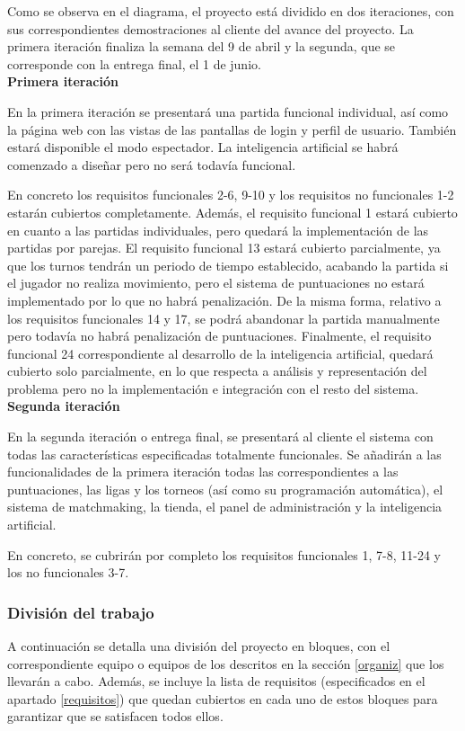 Como se observa en el diagrama, el proyecto está dividido en dos iteraciones, con sus correspondientes demostraciones al cliente del avance del proyecto. La primera iteración finaliza la semana del 9 de abril y la segunda, que se corresponde con la entrega final, el 1 de junio.\\

\textbf{Primera iteración}

En la primera iteración se presentará una partida funcional individual, así como la página web con las vistas de las pantallas de login y perfil de usuario. También estará disponible el modo espectador. La inteligencia artificial se habrá comenzado a diseñar pero no será todavía funcional.

En concreto los requisitos funcionales 2-6, 9-10 y los requisitos no funcionales 1-2 estarán cubiertos completamente. Además, el requisito funcional 1 estará cubierto en cuanto a las partidas individuales, pero quedará la implementación de las partidas por parejas. El requisito funcional 13 estará cubierto parcialmente, ya que los turnos tendrán un periodo de tiempo establecido, acabando la partida si el jugador no realiza movimiento, pero el sistema de puntuaciones no estará implementado por lo que no habrá penalización. De la misma forma, relativo a los requisitos funcionales 14 y 17, se podrá abandonar la partida manualmente pero todavía no habrá penalización de puntuaciones. Finalmente, el requisito funcional 24 correspondiente al desarrollo de la inteligencia artificial, quedará cubierto solo parcialmente, en lo que respecta a análisis y representación del problema pero no la implementación e integración con el resto del sistema.\\

\textbf{Segunda iteración}

En la segunda iteración o entrega final, se presentará al cliente el sistema con todas las características especificadas totalmente funcionales. Se añadirán a las funcionalidades de la primera iteración todas las correspondientes a las puntuaciones, las ligas y los torneos (así como su programación automática), el sistema de matchmaking, la tienda, el panel de administración y la inteligencia artificial.

En concreto, se cubrirán por completo los requisitos funcionales 1, 7-8, 11-24 y los no funcionales 3-7.


\subsubsection*{División del trabajo}
A continuación se detalla una división del proyecto en bloques, con el correspondiente equipo o equipos de los descritos en la sección \ref{organiz} que los llevarán a cabo. Además, se incluye la lista de requisitos (especificados en el apartado \ref{requisitos}) que quedan cubiertos en cada uno de estos bloques para garantizar que se satisfacen todos ellos.

